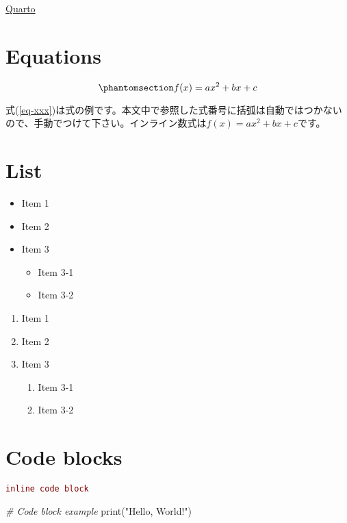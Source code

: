 \documentclass[
  japanese,
  letterpaper,
  lualatex,
  ja=standard,
  10pt,
  a4paper,
  textwidth-limit=50,
  openany]{bxjsbook}
\newenvironment{Shaded}{\begin{snugshade}}{\end{snugshade}}
\newcommand{\BuiltInTok}[1]{#1}
\newcommand{\CommentTok}[1]{\textcolor[rgb]{0.56,0.35,0.01}{\textit{#1}}}
\newcommand{\NormalTok}[1]{#1}
\newcommand{\StringTok}[1]{\textcolor[rgb]{0.31,0.60,0.02}{#1}}
\providecommand{\tightlist}{%
  \setlength{\itemsep}{0pt}\setlength{\parskip}{0pt}}
\let\oldtexttt\texttt
\renewcommand{\texttt}[1]{  %
  \colorbox{codebg}{  %
    \textcolor{Maroon}{  %
      \small  %
      \oldtexttt{#1}
    }
  }
}
\begin{document}
\href{https://quarto.org}{Quarto}

\section{Equations}\label{equations-1}

\begin{equation}\phantomsection\label{eq-xxx}{
  f(x) = ax^2 + bx + c
}\end{equation}

式(\ref{eq-xxx})は式の例です。本文中で参照した式番号に括弧は自動ではつかないので、手動でつけて下さい。インライン数式は\(f(x) = ax^2 + bx + c\)です。

\section{List}\label{list-1}

\begin{itemize}
\tightlist
\item
  Item 1
\item
  Item 2
\item
  Item 3

  \begin{itemize}
  \tightlist
  \item
    Item 3-1
  \item
    Item 3-2
  \end{itemize}
\end{itemize}

\begin{enumerate}
\def\labelenumi{\arabic{enumi}.}
\tightlist
\item
  Item 1
\item
  Item 2
\item
  Item 3

  \begin{enumerate}
  \def\labelenumii{\arabic{enumii}.}
  \tightlist
  \item
    Item 3-1
  \item
    Item 3-2
  \end{enumerate}
\end{enumerate}

\section{Code blocks}\label{code-blocks-1}

\texttt{inline\ code\ block}

\begin{Shaded}
\begin{Highlighting}[]
\CommentTok{\# Code block example}
\BuiltInTok{print}\NormalTok{(}\StringTok{"Hello, World!"}\NormalTok{)}
\end{Highlighting}
\end{Shaded}
\end{document}
